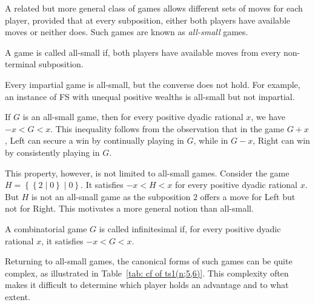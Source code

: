 \documentclass[oneside,reqno]{amsart}
\begin{document}
    A related but more general class of games allows different sets of moves for each player, provided that at every subposition, either both players have available moves or neither does. 
    Such games are known as \emph{all-small} games. 

    \begin{definition}
     A game is called all-small if, both players have available moves from every non-terminal subposition.
    \end{definition}
    
    Every impartial game is all-small, but the converse does not hold. For example, an instance of {\sc FS} with unequal positive wealths is all-small but not impartial.
    
    If $G$ is an all-small game, then for every positive dyadic rational $x$, we have $ -x < G < x$. This inequality follows from the observation that in the game $G + x$, Left can secure a win by continually playing in $G$, while in $G - x$, Right can win by consistently playing in $G$.

    
   
    This property, however, is not limited to all-small games. Consider the game $H = \left\{ \left\{ 2 \mid 0 \right\} \mid 0 \right\}$. It satisfies  $-x < H < x$ for every positive dyadic rational $x$. But $H$ is not an all-small game as the subposition $2$ offers a move for Left but not for Right. This motivates a more general notion than all-small.
    
    \begin{definition}
        A combinatorial game $G$ is called infinitesimal if, for every positive dyadic rational $x$, it satisfies $-x<G<x$.
    \end{definition}

  
    Returning to all-small games, the canonical forms of such games can be quite complex, as illustrated in Table~\ref{tab: cf of ts1(n;5,6)}. This complexity often makes it difficult to determine which player holds an advantage and to what extent. 
    
\end{document}
